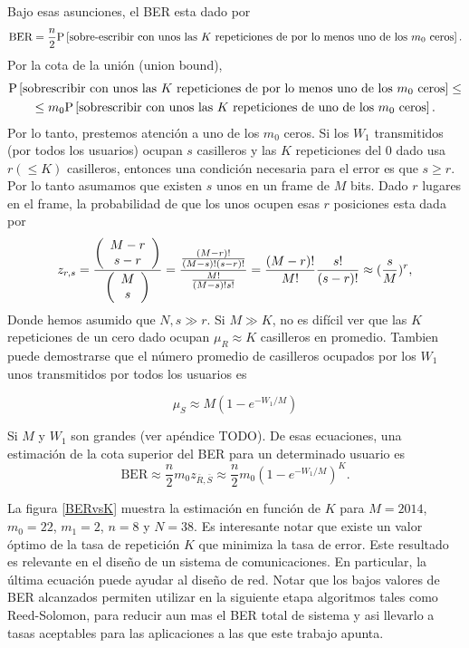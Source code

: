 Bajo esas asunciones, el BER esta dado por
\begin{equation}
\text{BER} = \frac{n}{2}\mathrm{P}\left[\text{sobre-escribir con unos las $K$ repeticiones de por lo menos uno de los $m_0$ ceros}\right].
\label{eq:ber_01}
\end{equation}
Por la cota de la unión (union bound), 
\begin{multline}
\mathrm{P}\left[\text{sobrescribir con unos las $K$ repeticiones de por lo menos uno de los $m_0$ ceros}\right]\leq \\
\leq m_0\mathrm{P}\left[\text{sobrescribir con unos las $K$ repeticiones de uno de los $m_0$ ceros}\right].
\label{eq:union_bound}
\end{multline}
Por lo tanto, prestemos atención a uno de los $m_0$ ceros. Si los $W_{1}$ transmitidos (por todos los usuarios) ocupan $s$ casilleros y las $K$ repeticiones del 0 dado usa $r ( \leq K)$ casilleros, entonces una condición necesaria para el error es que $s \geq r$. Por lo tanto asumamos que existen $s$ unos en un frame de $M$ bits. Dado $r$ lugares en el frame, la probabilidad de que los unos ocupen esas $r$ posiciones esta dada por 
\begin{equation}
z_{r,s} = \frac{\left(\begin{array}{c} M-r \\ s-r\end{array}\right)}{\left(\begin{array}{c} M \\ s\end{array}\right)}= \frac{\frac{(M-r)!}{(M-s)! (s-r)!}}{\frac{M!}{(M-s)!s!}} = \frac{(M-r)!}{M!}\frac{s!}{(s-r)!}\approx (\frac{s}{M})^r,
\end{equation}
Donde hemos asumido que $N,s\gg r$. Si $M \gg K$, no es difícil ver que las $K$ repeticiones de un cero dado ocupan $\mu_{R} \approx K$ casilleros en promedio. Tambien puede demostrarse que el número promedio de casilleros ocupados por los $W_{1}$ unos transmitidos por todos los usuarios es

\begin{equation}
\mu_{S} \approx M (1-e^{-W_1/M})
\end{equation}
 
Si $M$ y $W_{1}$ son grandes (ver apéndice TODO).
De esas ecuaciones, una estimación de la cota superior del BER para un determinado usuario es
\begin{equation}
\text{BER} \approx \frac{n}{2} m_0 z_{\bar{R},\bar{S}} \approx \frac{n}{2} m_0 \left(1-e^{-W_1/M}\right)^K.
\end{equation}

La figura \ref{BERvsK} muestra la estimación en función de $K$ para $M=2014$, $m_{0} = 22$, $m_{1} = 2$, $n = 8$ y $N=38$. Es interesante notar que existe un valor óptimo de la tasa de repetición $K$ que minimiza la tasa de error. Este resultado es relevante en el diseño de un sistema de comunicaciones. En particular, la última ecuación puede ayudar al diseño de red. Notar que los bajos valores de BER alcanzados permiten utilizar en la siguiente etapa algoritmos tales como Reed-Solomon, para reducir aun mas el BER total de sistema y asi llevarlo a tasas aceptables para las aplicaciones a las que este trabajo apunta.

